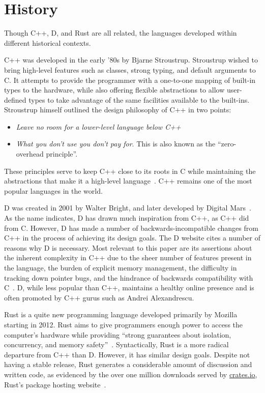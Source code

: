\documentclass[finalcopy]{srpaper}
\begin{document}
\section{History}

Though C++, D, and Rust are all related, the languages developed within
different historical contexts.

C++ was developed in the early '80s by Bjarne Stroustrup. Stroustrup wished to
bring high-level features such as classes, strong typing, and default arguments
to C. It attempts to provide the programmer with a one-to-one mapping of
built-in types to the hardware, while also offering flexible abstractions to
allow user-defined types to take advantage of the same facilities available to
the built-ins. Stroustrup himself outlined the design philosophy of C++ in two
points:

\begin{itemize}
\item \textit{Leave no room for a lower-level language below C++}
\item \textit{What you don't use you don't pay for}. This is also known as the
``zero-overhead principle''.
\end{itemize}

These principles serve to keep C++ close to its roots in C while maintaining
the abstractions that make it a high-level language~\cite{stroustrup2013the}.
C++ remains one of the most popular languages in the world.

D was created in 2001 by Walter Bright, and later developed by Digital
Mars~\cite{Doverview}. As the name indicates, D has drawn much inspiration from
C++, as C++ did from C. However, D has made a number of backwards-incompatible
changes from C++ in the process of achieving its design goals. The D website
cites a number of reasons why D is necessary. Most relevant to this paper are
its assertions about the inherent complexity in C++ due to the sheer number of
features present in the language, the burden of explicit memory management, the
difficulty in tracking down pointer bugs, and the hindrance of backwards
compatibility with C~\cite{Doverview}. D, while less popular than C++,
maintains a healthy online presence and is often promoted by C++ gurus such as
Andrei Alexandrescu.

Rust is a quite new programming language developed primarily by Mozilla
starting in 2012. Rust aims to give programmers enough power to access the
computer's hardware while providing ``strong guarantees about isolation,
concurrency, and memory safety''~\cite{Matsakis:2014:RL:2663171.2663188}.
Syntactically, Rust is a more radical departure from C++ than D. However, it
has similar design goals. Despite not having a stable release, Rust generates a
considerable amount of discussion and written code, as evidenced by the over
one million downloads served by \url{crates.io}, Rust's package hosting
website~\cite{Cratesio}.
\end{document}
